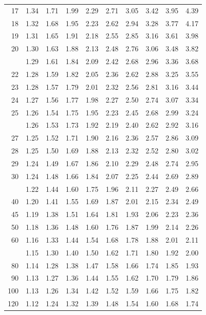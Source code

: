 \documentclass[10pt]{article}
\begin{document}
\begin{longtable}{@{}r!{\vrule width 0.8pt\hspace{0.55em}}rrrrrrrrr@{}}
17 & 1.34 & 1.71 & 1.99 & 2.29 & 2.71 & 3.05 & 3.42 & 3.95 & 4.39 \\
18 & 1.32 & 1.68 & 1.95 & 2.23 & 2.62 & 2.94 & 3.28 & 3.77 & 4.17 \\
19 & 1.31 & 1.65 & 1.91 & 2.18 & 2.55 & 2.85 & 3.16 & 3.61 & 3.98 \\
20 & 1.30 & 1.63 & 1.88 & 2.13 & 2.48 & 2.76 & 3.06 & 3.48 & 3.82 \\
 & 1.29 & 1.61 & 1.84 & 2.09 & 2.42 & 2.68 & 2.96 & 3.36 & 3.68 \\
22 & 1.28 & 1.59 & 1.82 & 2.05 & 2.36 & 2.62 & 2.88 & 3.25 & 3.55 \\
23 & 1.28 & 1.57 & 1.79 & 2.01 & 2.32 & 2.56 & 2.81 & 3.16 & 3.44 \\
24 & 1.27 & 1.56 & 1.77 & 1.98 & 2.27 & 2.50 & 2.74 & 3.07 & 3.34 \\
25 & 1.26 & 1.54 & 1.75 & 1.95 & 2.23 & 2.45 & 2.68 & 2.99 & 3.24 \\
 & 1.26 & 1.53 & 1.73 & 1.92 & 2.19 & 2.40 & 2.62 & 2.92 & 3.16 \\
27 & 1.25 & 1.52 & 1.71 & 1.90 & 2.16 & 2.36 & 2.57 & 2.86 & 3.09 \\
28 & 1.25 & 1.50 & 1.69 & 1.88 & 2.13 & 2.32 & 2.52 & 2.80 & 3.02 \\
29 & 1.24 & 1.49 & 1.67 & 1.86 & 2.10 & 2.29 & 2.48 & 2.74 & 2.95 \\
30 & 1.24 & 1.48 & 1.66 & 1.84 & 2.07 & 2.25 & 2.44 & 2.69 & 2.89 \\
 & 1.22 & 1.44 & 1.60 & 1.75 & 1.96 & 2.11 & 2.27 & 2.49 & 2.66 \\
40 & 1.20 & 1.41 & 1.55 & 1.69 & 1.87 & 2.01 & 2.15 & 2.34 & 2.49 \\
45 & 1.19 & 1.38 & 1.51 & 1.64 & 1.81 & 1.93 & 2.06 & 2.23 & 2.36 \\
50 & 1.18 & 1.36 & 1.48 & 1.60 & 1.76 & 1.87 & 1.99 & 2.14 & 2.26 \\
60 & 1.16 & 1.33 & 1.44 & 1.54 & 1.68 & 1.78 & 1.88 & 2.01 & 2.11 \\
 & 1.15 & 1.30 & 1.40 & 1.50 & 1.62 & 1.71 & 1.80 & 1.92 & 2.00 \\
80 & 1.14 & 1.28 & 1.38 & 1.47 & 1.58 & 1.66 & 1.74 & 1.85 & 1.93 \\
90 & 1.13 & 1.27 & 1.36 & 1.44 & 1.55 & 1.62 & 1.70 & 1.79 & 1.86 \\
100 & 1.13 & 1.26 & 1.34 & 1.42 & 1.52 & 1.59 & 1.66 & 1.75 & 1.82 \\
120 & 1.12 & 1.24 & 1.32 & 1.39 & 1.48 & 1.54 & 1.60 & 1.68 & 1.74 \\

\end{longtable}
\end{document}
